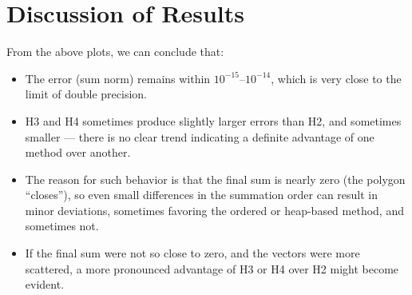 \documentclass[a4paper,12pt]{article}
\begin{document}
\section{Discussion of Results}
From the above plots, we can conclude that:
\begin{itemize}
    \item The error (sum norm) remains within \(10^{-15}\)--\(10^{-14}\), which is very close to the limit of double precision.
    \item H3 and H4 sometimes produce slightly larger errors than H2, and sometimes smaller --- there is no clear trend indicating a definite advantage of one method over another.
    \item The reason for such behavior is that the final sum is nearly zero (the polygon “closes”), so even small differences in the summation order can result in minor deviations, sometimes favoring the ordered or heap-based method, and sometimes not.
    \item If the final sum were not so close to zero, and the vectors were more scattered, a more pronounced advantage of H3 or H4 over H2 might become evident.
\end{itemize}
\end{document}
